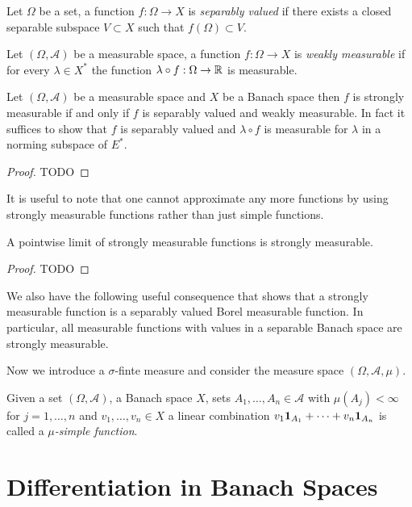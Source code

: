 \begin{defn}Let $\Omega$ be a set, a function $f : \Omega \to X$ is
  \emph{separably valued} if there exists a closed separable subspace $V
  \subset X$ such that $f(\Omega) \subset V$.  
\end{defn}

\begin{defn}Let $(\Omega, \mathcal{A})$ be a measurable space, a function $f : \Omega \to X$ is
  \emph{weakly measurable} if for every $\lambda \in X^*$ the function
  $\lambda \circ f : \Omega \to \mathbb{R}$ is measurable. 
\end{defn}

\begin{thm}Let $(\Omega, \mathcal{A})$ be a measurable space and $X$
  be a Banach space then $f$ is strongly measurable if and only if $f$
  is separably valued and weakly measurable.  In fact it suffices to
  show that $f$ is separably valued and $\lambda \circ f$ is
  measurable for $\lambda$ in a norming subspace of $E^*$.
\end{thm}
\begin{proof}
TODO
\end{proof}

It is useful to note that one cannot approximate any more functions by
using strongly measurable functions rather than just simple functions.
\begin{cor}A pointwise limit of strongly measurable functions is strongly measurable.
\end{cor}
\begin{proof}
TODO
\end{proof}

We also have the following useful consequence that shows that a
strongly measurable function is a separably valued Borel measurable
function.  In particular, all measurable functions with values in a
separable Banach space are strongly measurable.

Now we introduce a $\sigma$-finte measure and consider the measure
space $(\Omega, \mathcal{A}, \mu)$.  
\begin{defn}Given a set $(\Omega, \mathcal{A})$, a Banach space $X$,
  sets $A_1, \dotsc, A_n \in \mathcal{A}$ with $\mu(A_j) < \infty$ for
  $j=1, \dotsc, n$ and $v_1, \dotsc, v_n \in X$ a
  linear combination $v_1
  \textbf{1}_{A_1} + \cdots + v_n \textbf{1}_{A_n}$ is called
  a \emph{$\mu$-simple function}.
\end{defn}

\section{Differentiation in Banach Spaces}

